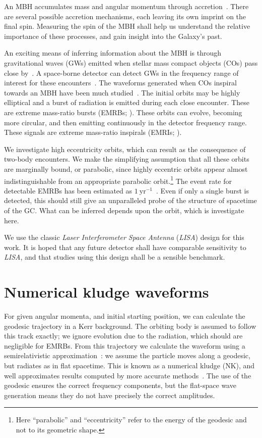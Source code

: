 \documentclass[11pt,twoside]{article}
\begin{document}
An MBH accumulates mass and angular momentum through accretion~\citep{Volonteri2010}. There are several possible accretion mechanisms, each leaving its own imprint on the final spin. Measuring the spin of the MBH shall help us understand the relative importance of these processes, and gain insight into the Galaxy's past.

An exciting means of inferring information about the MBH is through gravitational waves (GWs) emitted when stellar mass compact objects (COs) pass close by~\citep{Sathyaprakash2009}. A space-borne detector can detect GWs in the frequency range of interest for these encounters~\citep{Danzmann2003, Amaro-Seoane2012a}. The waveforms generated when COs inspiral towards an MBH have been much studied~\citep{Glampedakis2005}. The initial orbits may be highly elliptical and a burst of radiation is emitted during each close encounter. These are extreme mass-ratio bursts (EMRBs; \citealt*{Rubbo2006}). These orbits can evolve, becoming more circular, and then emitting continuously in the detector frequency range. These signals are extreme mass-ratio inspirals (EMRIs; \citealt{Amaro-Seoane2007}).

We investigate high eccentricity orbits, which can result as the consequence of two-body encounters. We make the simplifying assumption that all these orbits are marginally bound, or parabolic, since highly eccentric orbits appear almost indistinguishable from an appropriate parabolic orbit.\footnote{Here ``parabolic'' and ``eccentricity'' refer to the energy of the geodesic and not to its geometric shape.} The event rate for detectable EMRBs has been estimated as $1~\mathrm{yr^{-1}}$~\citep*{Hopman2007}. Even if only a single burst is detected, this should still give an unparalleled probe of the structure of spacetime of the GC. What can be inferred depends upon the orbit, which is investigate here. 

We use the classic \textit{Laser Interferometer Space Antenna} (\textit{LISA}) design for this work. It is hoped that any future detector shall have comparable sensitivity to \textit{LISA}, and that studies using this design shall be a sensible benchmark.

\section{Numerical kludge waveforms}

For given angular momenta, and initial starting position, we can calculate the geodesic trajectory in a Kerr background. The orbiting body is assumed to follow this track exactly; we ignore evolution due to the radiation, which should are negligible for EMRBs. From this trajectory we calculate the waveform using a semirelativistic approximation~\citep{Ruffini1981}: we assume the particle moves along a geodesic, but radiates as in flat spacetime. This is known as a numerical kludge (NK), and well approximates results computed by more accurate methods~\citep{Babak2007}. The use of the geodesic ensures the correct frequency components, but the flat-space wave generation means they do not have precisely the correct amplitudes.
\end{document}
